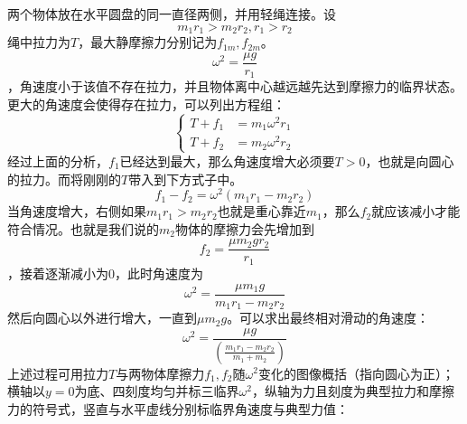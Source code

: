 \begin{casetypebox}[title={\strut\textcolor{white}{\bfseries 常见题型：水平圆盘、两侧物体、重心不在圆心}}]
  两个物体放在水平圆盘的同一直径两侧，并用轻绳连接。设
  \[
    m_1r_1>m_2r_2, r_1 > r_2
  \]
  绳中拉力为$T$，最大静摩擦力分别记为$f_{1m},f_{2m}$。\\
  \[\omega^2 = \frac{\mu g}{r_1}\]，角速度小于该值不存在拉力，并且物体离中心越远越先达到摩擦力的临界状态。\\
  更大的角速度会使得存在拉力，可以列出方程组：
  \[
    \left\{
    \begin{aligned}
      T+f_1 & =m_1\omega^2 r_1 \\
      T+f_2 & =m_2\omega^2 r_2
    \end{aligned}\right.
  \]
  经过上面的分析，$f_1$已经达到最大，那么角速度增大必须要$T>0$，也就是向圆心的拉力。而将刚刚的$T$带入到下方式子中。
  \[f_1-f_2=\omega^2(m_1r_1-m_2r_2)\]
  当角速度增大，右侧如果$m_1r_1>m_2r_2$也就是重心靠近$m_1$，那么$f_2$就应该减小才能符合情况。也就是我们说的$m_2$物体的摩擦力会先增加到\[f_2=\frac{\mu m_2g r_2}{r_1}\]，接着逐渐减小为0，此时角速度为
  \[\omega^2=\frac{\mu m_1 g}{m_1r_1-m_2r_2}\]
  然后向圆心以外进行增大，一直到$\mu m_2 g$。可以求出最终相对滑动的角速度：
  \[\omega^2=\frac{\mu g}{(\frac{m_1r_1-m_2r_2}{m_1+m_2})}\]
  上述过程可用拉力$T$与两物体摩擦力$f_1,f_2$随$\omega^2$变化的图像概括（指向圆心为正）；横轴以$y=0$为底、四刻度均匀并标三临界$\omega^2$，纵轴为力且刻度为典型拉力和摩擦力的符号式，竖直与水平虚线分别标临界角速度与典型力值：
  \\
  
\end{casetypebox}
